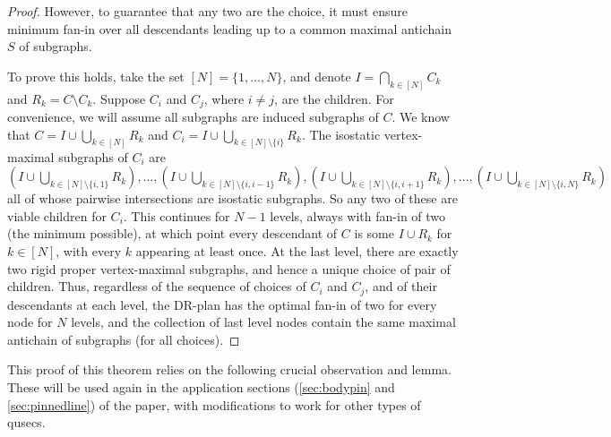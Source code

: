 \begin{proof}
\newcommand{\induceonc}[1]{Idc\left(C,#1\right)}
\renewcommand{\induceonc}[1]{#1}
\newcommand{\iunion}[1]{\induceonc{I\cup\bigcup_{k\in [N]\setminus\{#1\}}{R_k}}}

However, to guarantee that any two are the  choice, it must ensure minimum fan-in over all descendants leading up to a common maximal antichain $S$ of subgraphs.

To prove this holds, take the set $[N]=\{1,\dots,N\}$, and denote $I=\bigcap_{k\in [N]}{C_k}$ and $R_k=C\setminus C_k$. Suppose  $C_i$ and $C_j$, where $i\neq j$,  are  the children. For convenience, we will assume all subgraphs are induced subgraphs of $C$. We know that $C=\induceonc{I\cup\bigcup_{k\in [N]}{R_k}}$ and $C_i=\iunion{i}$. The isostatic vertex-maximal subgraphs of $C_i$ are $(\iunion{i,1}),\ldots,(\iunion{i,i-1}),(\iunion{i,i+1}),\ldots,(\iunion{i,N})$ all of whose pairwise intersections are isostatic subgraphs. So any two of these are viable children for $C_i$.
This continues for $N-1$ levels, always with fan-in of two (the minimum possible), at which point every descendant of $C$ is some $\induceonc{I\cup R_k}$ for $k\in [N]$, with every $k$ appearing at least once. At the last level, there are exactly two rigid proper vertex-maximal subgraphs, and hence a unique choice of pair of children. Thus, regardless of the sequence of choices of $C_i$ and $C_j$, and of their descendants at each level, the DR-plan has the optimal fan-in of two for every node for  $N$ levels,  and the collection of last level nodes contain the same maximal antichain of subgraphs (for all choices).
%
%
\end{proof}

This proof of this theorem relies on the following crucial observation and lemma. These will be used again in the application sections (\ref{sec:bodypin} and \ref{sec:pinnedline}) of the paper, with modifications to work for other types of qusecs.

